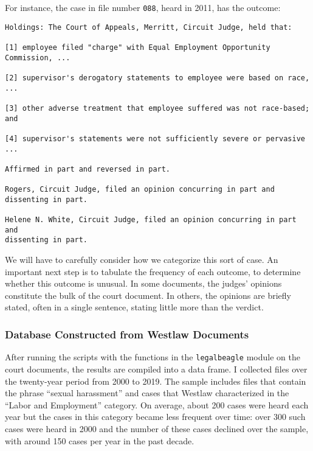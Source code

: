 \documentclass[11pt]{paper}
\begin{document}
For instance, the case in file number \texttt{088}, heard in 2011, 
has the outcome:
%
\begin{verbatim}
Holdings: The Court of Appeals, Merritt, Circuit Judge, held that:
 
[1] employee filed "charge" with Equal Employment Opportunity Commission, ...
 
[2] supervisor's derogatory statements to employee were based on race, ...
 
[3] other adverse treatment that employee suffered was not race-based; and
 
[4] supervisor's statements were not sufficiently severe or pervasive ...
 
Affirmed in part and reversed in part.
 
Rogers, Circuit Judge, filed an opinion concurring in part and dissenting in part.
 
Helene N. White, Circuit Judge, filed an opinion concurring in part and 
dissenting in part.
\end{verbatim}
%
We will have to carefully consider how we categorize this sort of case. 
An important next step is to tabulate the frequency of each outcome, 
to determine whether this outcome is unusual. 
In some documents, the judges' opinions 
constitute the bulk of the court document. 
In others, the opinions are briefly stated, often in a single sentence, 
stating little more than the verdict. 


\subsubsection*{Database Constructed from Westlaw Documents}

After running the scripts with the functions in the \texttt{legalbeagle} module 
on the court documents, the results are compiled into a data frame. 
I collected files over the twenty-year period from 2000 to 2019. 
The sample includes files that contain the phrase ``sexual harassment'' 
and cases that Westlaw characterized in the ``Labor and Employment'' category. 
On average,  about 200 cases were heard each year
but the cases in this category became less frequent over time:
over 300 such cases were heard in 2000 
and the number of these cases declined over the sample, 
with around 150 cases per year in the past decade. 
\end{document}
